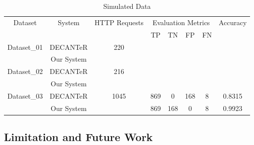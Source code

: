 \begin{table*}[!h]
\centering
\caption{Simulated Data}
\label{tbl:db_03}
\begin{tabular}{|c|c|c|c|c|c|c|c|}
\hline\hline
\multirow{2}{*}{Dataset}     & \multirow{2}{*}{System} & \multirow{2}{*}{HTTP Requests} & \multicolumn{4}{c|}{Evaluation Metrics} & \multirow{2}{*}{Accuracy} \\ \cline{4-7}
                             &                         &                                & TP       & TN       & FP       & FN     &                           \\ \hline
\multirow{2}{*}{Dataset\_01} & DECANTeR \cite{bortolameotti2017decanter}                & \multirow{2}{*}{220}           &          &          &          &        &                           \\ \cline{2-2} \cline{4-8} 
                             & Our System              &                                &          &          &          &        &                           \\ \hline
\multirow{2}{*}{Dataset\_02} & DECANTeR \cite{bortolameotti2017decanter}                & \multirow{2}{*}{216}           &          &          &          &        &                           \\ \cline{2-2} \cline{4-8} 
                             & Our System              &                                &          &          &          &        &                           \\ \hline
\multirow{2}{*}{Dataset\_03} & DECANTeR \cite{bortolameotti2017decanter}                & \multirow{2}{*}{1045}          & 869      & 0        & 168      & 8      & 0.8315                    \\ \cline{2-2} \cline{4-8} 
                             & Our System              &                                & 869      & 168      & 0        & 8      & 0.9923                    \\ \hline\hline
\end{tabular}
\end{table*}


\subsection{Limitation and Future Work}
